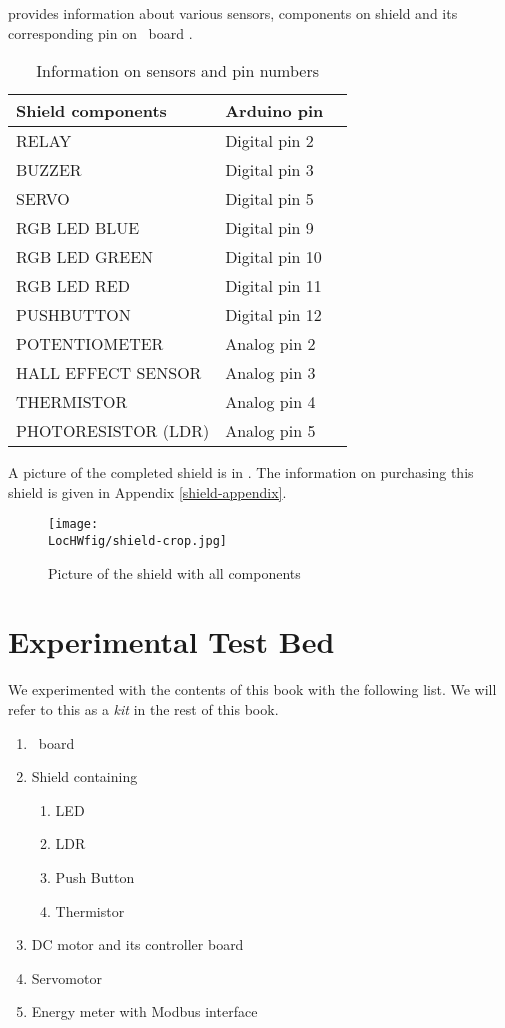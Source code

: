  provides information about various sensors,
components on shield and its corresponding pin on \arduino\ board
\cite{shield-ref}.
\begin{table}
  \centering
  \caption{Information on sensors and pin numbers}
  \label{shield-table}
  \begin{tabular}{llc}
    \hline
    Shield components   & Arduino pin    \\ \hline
    RELAY               & Digital pin 2  \\
    BUZZER              & Digital pin 3  \\
    SERVO               & Digital pin 5  \\
    RGB LED BLUE        & Digital pin 9  \\
    RGB LED GREEN       & Digital pin 10 \\
    RGB LED RED         & Digital pin 11 \\
    PUSHBUTTON          & Digital pin 12 \\
    POTENTIOMETER       & Analog pin 2   \\
    HALL EFFECT SENSOR  & Analog pin 3   \\
    THERMISTOR          & Analog pin 4   \\
    PHOTORESISTOR (LDR) & Analog pin 5   \\

    \hline
  \end{tabular}
\end{table}
A picture of the completed shield is in . The information on purchasing this shield is given in Appendix \ref{shield-appendix}.
\begin{figure}
  \centering
  \texttt{[image: \\LocHWfig/shield-crop.jpg]}
  \caption{Picture of the shield with all components}
  \label{shield}
\end{figure}

\section{Experimental Test Bed}
We experimented with the contents of this book with the
following list.  We will refer to this as a \emph{kit} in the rest of
this book.
\begin{enumerate}
  \item \arduino\ board
  \item Shield containing
        \begin{enumerate}
          \item LED
          \item LDR
          \item Push Button
          \item Thermistor
        \end{enumerate}
  \item DC motor and its controller board
  \item Servomotor
  \item Energy meter with Modbus interface
\end{enumerate}

